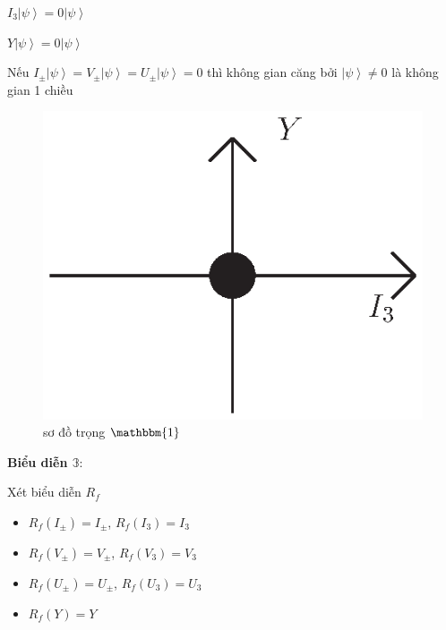 \documentclass{report}
\begin{document}
\hspace{1cm} \( I_{3} \left| \psi \right\rangle = 0 \left| \psi \right\rangle \)

\hspace{1cm} \( Y \left| \psi \right\rangle = 0 \left| \psi \right\rangle \)

Nếu \( I_{\pm} \left| \psi \right\rangle = V_{\pm} \left| \psi \right\rangle = U_{\pm} \left| \psi \right\rangle = 0 \) thì không gian căng bởi  \( \left| \psi \right\rangle \neq 0\) là không gian 1 chiều

	\begin{figure}[!htb]
		\centering
		\includegraphics[scale=0.5]{diagram0.eps}
		\caption{sơ đồ trọng \( \mathbbm{1} \)}
	\end{figure}
		
\textbf{Biểu diễn \( \mathbb{3} \)}:
	
Xét biểu diễn \( R_{f} \)

	\begin{itemize}
		\item \( R_{f} ( I_{\pm} ) = I_{ \pm } \), \hspace*{0.5cm} \( R_{f} ( I_{3} ) = I_{ 3 } \)
		\item \( R_{f} ( V_{\pm} ) = V_{ \pm } \), \hspace*{0.4cm} \( R_{f} ( V_{3} ) = V_{ 3 } \)
		\item \( R_{f} ( U_{\pm} ) = U_{ \pm } \), \hspace*{0.4cm} \( R_{f} ( U_{3} ) = U_{ 3 } \)
		\item \( R_{f} ( Y ) = Y \)
	\end{itemize}
		
\end{document}
